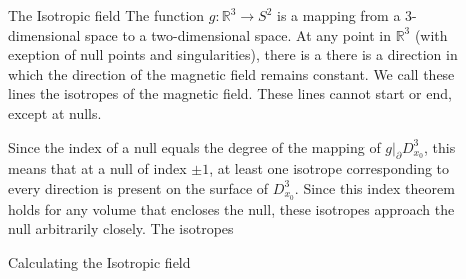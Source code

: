 \documentclass[final]{beamer}
\newlength{\sepwid}
\newlength{\onecolwid}
\newlength{\twocolwid}
\begin{document}
\begin{frame}[t]
\begin{columns}[t]
\begin{column}{\twocolwid}
\begin{columns}[t,totalwidth=\twocolwid]
\begin{column}{\onecolwid}
\end{column} %

\end{columns} %
\end{column} %

\begin{column}{\sepwid}\end{column} %

\begin{column}{\onecolwid} %


%

\begin{block}{The Isotropic field}
    The function $g:\mathbb{R}^3\rightarrow S^2$ 
    is a mapping from a 3-dimensional space to a two-dimensional space.
    At any point in $\mathbb{R}^3$ (with exeption of null points and singularities), 
    there is a there is a direction in which the direction
    of the magnetic field remains constant. 
    We call these lines the isotropes of the magnetic field. 
    These lines cannot start or end, except at nulls. 

    Since the index of a null equals the degree of the mapping of $g|_\partial D^3_{x_0}$, 
    this means that at a null of index $\pm 1$, at least one isotrope corresponding to every
    direction is present on the surface of $D^3_{x_0}$. 
    Since this index theorem holds for any volume that encloses the null, these isotropes
    approach the null arbitrarily closely. 
    The isotropes  
    


\end{block}


\begin{block}{Calculating the Isotropic field}


\end{block}
\end{column}
\end{columns}
\end{frame}
\end{document}

